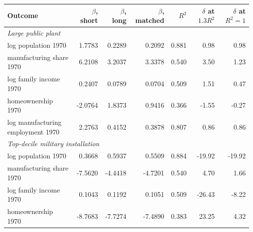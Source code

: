 \begin{tabular}{lrrrrrr}
\toprule
Outcome & $\beta$, short & $\beta$, long & $\beta$, matched & $R^2$ & $\delta$ at $1.3R^2$ & $\delta$ at $R^2=1$ \\
\midrule
\multicolumn{7}{l}{\emph{Large public plant}} \\
\quad log population 1970 & 1.7783 & 0.2289 & 0.2092 & 0.881 & 0.98 & 0.98 \\
\quad manufacturing share 1970 & 6.2108 & 3.2037 & 3.3378 & 0.540 & 3.50 & 1.23 \\
\quad log family income 1970 & 0.2407 & 0.0789 & 0.0704 & 0.509 & 1.51 & 0.47 \\
\quad homeownership 1970 & -2.0764 & 1.8373 & 0.9416 & 0.366 & -1.55 & -0.27 \\
\quad log manufacturing employment 1970 & 2.2763 & 0.4152 & 0.3878 & 0.807 & 0.86 & 0.86 \\
\multicolumn{7}{l}{\emph{Top-decile military installation}} \\
\quad log population 1970 & 0.3668 & 0.5937 & 0.5509 & 0.884 & -19.92 & -19.92 \\
\quad manufacturing share 1970 & -7.5620 & -4.4418 & -4.7201 & 0.540 & 4.70 & 1.66 \\
\quad log family income 1970 & 0.1043 & 0.1192 & 0.1051 & 0.509 & -26.43 & -8.22 \\
\quad homeownership 1970 & -8.7683 & -7.7274 & -7.4890 & 0.383 & 23.25 & 4.32 \\
\bottomrule
\end{tabular}